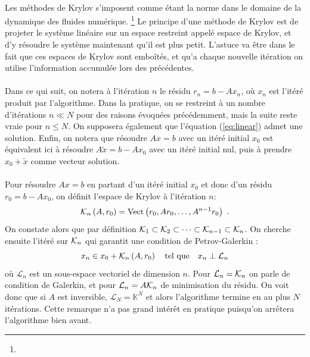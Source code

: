     \paragraph{}
    Les méthodes de Krylov s'imposent comme étant la norme dans le domaine de la dynamique des fluides numérique.
    \footnote{}
    Le principe d'une méthode de Krylov est de projeter le système linéaire sur un espace restreint appelé espace de Krylov, et d'y résoudre le système maintenant qu'il est plus petit.
		L'astuce va être dans le fait que ces espaces de Krylov sont emboîtés, et qu'a chaque nouvelle itération on utilise l'information accumulée lors des précédentes.

		\paragraph{}
		Dans ce qui suit, on notera à l'itération $n$ le résidu $r_n = b - Ax_n$, où $x_n$ est l'itéré produit par l'algorithme.
		Dans la pratique, on se restreint à un nombre d'itérations $n\ll N$ pour des raisons évoquées précédemment, mais la suite reste vraie pour $n\le N$.
		On supposera également que l'équation (\ref{eq:linear}) admet une solution.
		Enfin, on notera que résoudre $Ax = b$ avec un itéré initial $x_0$ est équivalent ici à résoudre $A\tilde{x} = b - Ax_0$ avec un itéré initial nul, puis à prendre $x_0 + \tilde{x}$ comme vecteur solution.

		\paragraph{}
		Pour résoudre $Ax = b$ en partant d'un itéré initial $x_0$ et donc d'un résidu $r_0 = b - Ax_0$, on définit l'espace de Krylov à l'itération $n$:
		\begin{equation}\label{eqn:krylov}
			\krylov[A, r_0]{n} = \operatorname{Vect}\left(r_0, Ar_0, \dots, A^{n-1}r_0\right)\ .
		\end{equation}
		On constate alors que par définition $\krylov{1}\subset\krylov{2}\subset\dots\subset\krylov{n-1}\subset\krylov{n}$.
		On cherche ensuite l'itéré sur $\krylov{n}$ qui garantit une condition de Petrov-Galerkin \cite{SimonciniSzyld2007} :
		\begin{equation}\label{eqn:x_n}
			x_n \in x_0 + \krylov[A, r_0]{n}\quad\textrm{tel que}\quad x_n \perp \mathcal{L}_n
		\end{equation}
		où $\mathcal{L}_n$ est un sous-espace vectoriel de dimension $n$.
		Pour $\mathcal{L}_n = \krylov{n}$ on parle de condition de Galerkin, et pour $\mathcal{L}_n = A\krylov{n}$ de minimisation du résidu.
		On voit donc que si $A$ est inversible, $\mathcal{L}_N = \mathbb{K}^N$ et alors l'algorithme termine en au plus $N$ itérations.
		Cette remarque n'a pas grand intérêt en pratique puisqu'on arrêtera l'algorithme bien avant.

